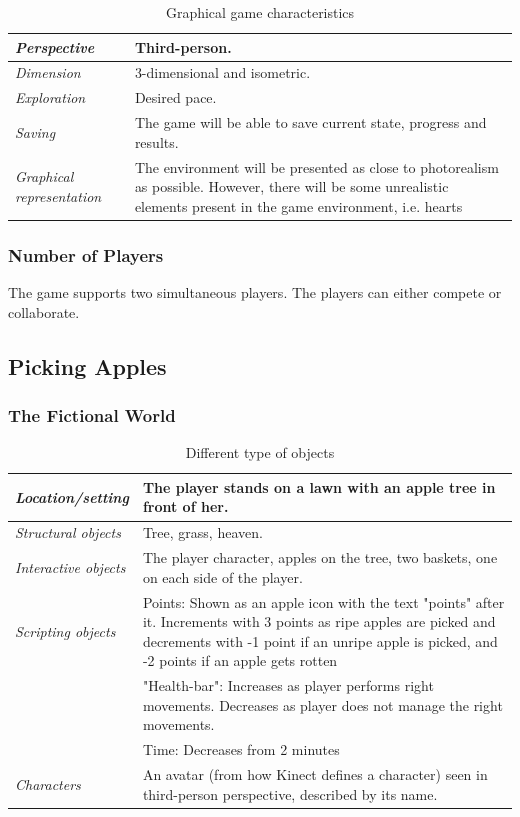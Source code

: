 \begin{table} [H]
\centering
\begin{tabular}{|p{}|p{}|}
\hline
\emph {Perspective} & Third-person. \\ \hline
\emph{Dimension} &  3-dimensional and isometric. \\ \hline
\emph{Exploration} & Desired pace. \\ \hline
\emph{Saving} & The game will be able to save current state, progress and results. \\ \hline
\emph{Graphical representation} & The environment will be presented as close to photorealism as possible.  However, there will be some unrealistic elements present in the game environment, i.e. hearts  \\ \hline
\end{tabular}
\caption[Graphical game characteristics]{Graphical game characteristics}
\label{tab:graphical1}
\end{table}  

\subsubsection{Number of Players}
The game supports two simultaneous players. The players can either compete or collaborate.

\subsection{Picking Apples}

\subsubsection{The Fictional World} 

\begin{table} [H]
\centering
\begin{tabular}{|p{}|p{}|}
\hline
\emph{Location/setting} & The player stands on a lawn with an apple tree in front of her. \\ \hline
\emph{Structural objects} & Tree, grass, heaven.  \\ \hline
\emph{Interactive objects} & The player character, apples on the tree, two baskets, one on each side of the player. \\ \hline
\emph{Scripting objects} &  Points: Shown as an apple icon with the text "points" after it. Increments with 3 points as ripe apples are picked and decrements with -1 point if an unripe apple is picked, and -2 points if an apple gets rotten \\ \cline{2-2}
& "Health-bar": Increases as player performs right  movements. Decreases as player does not manage the right  movements.  \\ \cline{2-2}
& Time: Decreases from 2 minutes \\ \hline
\emph{Characters} & An avatar (from how Kinect defines a character) seen in third-person perspective, described by its name. \\ \hline
\end{tabular}
\caption[Various objects in the "Picking Apples" game]{Different type of objects}
\label{tab:objects2}
\end{table}  
 
